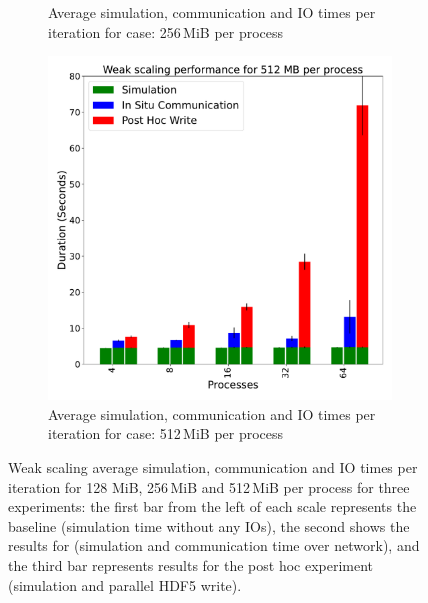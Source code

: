 \begin{figure}
\begin{subfigure}[b]{0.3\textwidth}
         \caption{Average simulation, communication and IO times per iteration for case: 256\,MiB per process}
         \label{fig:X256}
     \end{subfigure}
     \hfill
     \begin{subfigure}[b]{0.3\textwidth}
         \centering
         \includegraphics[width=\textwidth, height=\textwidth]{figures/512MB.pdf}
         \caption{Average simulation, communication and IO times per iteration for case: 512\,MiB per process}
         \label{fig:X512}
     \end{subfigure}
        \caption{Weak scaling average simulation, communication and IO times per iteration for 128 MiB, 256\,MiB and 512\,MiB per process for three experiments: the first bar from the left of each scale represents the baseline (simulation time without any IOs), the second shows the results for \deisa (simulation and communication time over network), and the third bar represents results for the post hoc experiment (simulation and parallel HDF5 write).}
        \label{fig:perfX1}
\end{figure}

